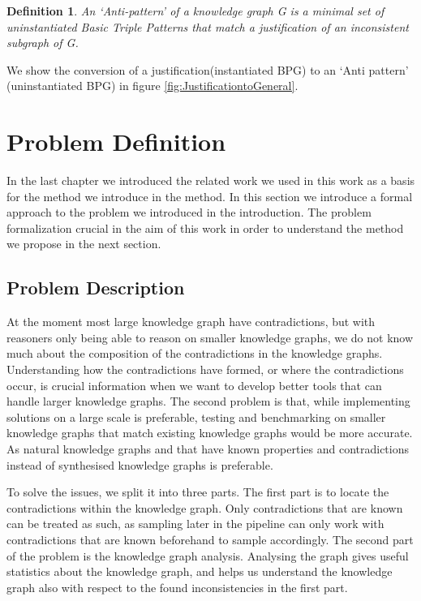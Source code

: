\documentclass{article}
\newtheorem{definition}{Definition}
\begin{document}
\begin{definition} 
	An \textit{`Anti-pattern'} \textit{of a knowledge graph G is a minimal set of uninstantiated Basic Triple Patterns that match a justification of an inconsistent subgraph of G.}
\end{definition}

We show the conversion of a justification(instantiated BPG) to an `Anti pattern' (uninstantiated BPG) in figure \ref{fig:JustificationtoGeneral}.

\newpage
\section{Problem Definition}
In the last chapter we introduced the related work we used in this work as a basis for the method we introduce in the method. In this section we introduce a formal approach to the problem we introduced in the introduction. The problem formalization crucial in the aim of this work in order to understand the method we propose in the next section.

\subsection{Problem Description}
At the moment most large knowledge graph have contradictions, but with reasoners only being able to reason on smaller knowledge graphs, we do not know much about the composition of the contradictions in the knowledge graphs. Understanding how the contradictions have formed, or where the contradictions occur, is crucial information when we want to develop better tools that can handle larger knowledge graphs. The second problem is that, while implementing solutions on a large scale is preferable, testing and benchmarking on smaller knowledge graphs that match existing knowledge graphs would be more accurate. As natural knowledge graphs and that have known properties and contradictions instead of synthesised knowledge graphs is preferable. 

To solve the issues, we split it into three parts. The first part is to locate the contradictions within the knowledge graph. Only contradictions that are known can be treated as such, as sampling later in the pipeline can only work with contradictions that are known beforehand to sample accordingly.
The second part of the problem is the knowledge graph analysis. Analysing the graph gives useful statistics about the knowledge graph, and helps us understand the knowledge graph also with respect to the found inconsistencies in the first part.
\end{document}

